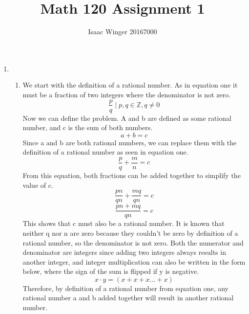 \documentclass{article}
\title{Math 120 Assignment 1}
\author{Isaac Winger 20167000}
\date{}
\begin{document}
    \begin{enumerate}
        \item \begin{enumerate} \item We start with the definition of a rational number. As in equation one it must be a fraction of two integers where the denominator is not zero.
            \begin{equation} \frac{p}{q} \mid p, q \in \mathbb{Z}, q \neq 0 \end{equation}
                      Now we can define the problem. A and b are defined as some rational number, and c is the sum of both numbers.
                      \begin{equation} a + b = c \end{equation}
                      Since a and b are both rational numbers, we can replace them with the definition of a rational number as seen in equation one.
                      \begin{equation} \frac{p}{q} + \frac{m}{n} = c \end{equation}
                      From this equation, both fractions can be added together to simplify the value of c.
                      \begin{equation} \frac{pn}{qn} + \frac{mq}{qn} = c \end{equation}
                      \begin{equation} \frac{pn + mq}{qn} = c \end{equation}
                      This shows that c must also be a rational number. It is known that neither q nor n are zero because they couldn't be zero by definition of a rational number, so the denominator is not zero. Both the numerator and denominator are integers since adding two integers always results in another integer, and integer multiplication can also be written in the form below, where the sign of the sum is flipped if y is negative.
                      \begin{equation} x \cdot y = (x + x + x \ldots + x)\end{equation}
                      Therefore, by definition of a rational number from equation one, any rational number a and b added together will result in another rational number.


\end{enumerate}
\end{enumerate}
\end{document}
